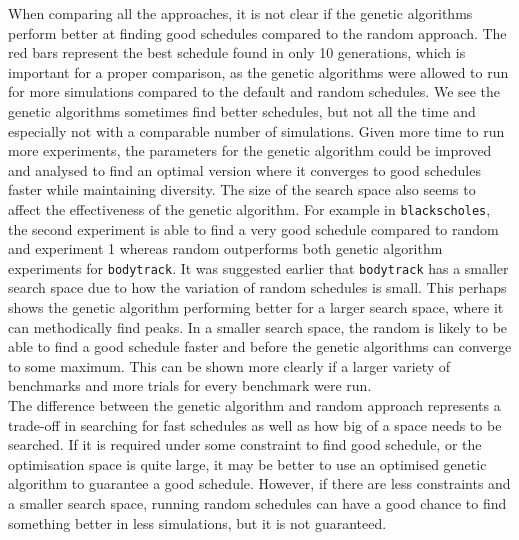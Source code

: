 \documentclass{article}
\newcommand{\n}[0]{\\[\baselineskip]}
\begin{document}
When comparing all the approaches, it is not clear if the genetic algorithms perform better at finding good schedules compared to the random approach. The red bars represent the best schedule found in only 10 generations, which is important for a proper comparison, as the genetic algorithms were allowed to run for more simulations compared to the default and random schedules. We see the genetic algorithms sometimes find better schedules, but not all the time and especially not with a comparable number of simulations. Given more time to run more experiments, the parameters for the genetic algorithm could be improved and analysed to find an optimal version where it converges to good schedules faster while maintaining diversity. The size of the search space also seems to affect the effectiveness of the genetic algorithm. For example in \texttt{blackscholes}, the second experiment is able to find a very good schedule compared to random and experiment 1 whereas random outperforms both genetic algorithm experiments for \texttt{bodytrack}. It was suggested earlier that \texttt{bodytrack} has a smaller search space due to how the variation of random schedules is small. This perhaps shows the genetic algorithm performing better for a larger search space, where it can methodically find peaks. In a smaller search space, the random is likely to be able to find a good schedule faster and before the genetic algorithms can converge to some maximum. This can be shown more clearly if a larger variety of benchmarks and more trials for every benchmark were run. 
\n
The difference between the genetic algorithm and random approach represents a trade-off in searching for fast schedules as well as how big of a space needs to be searched. If it is required under some constraint to find good schedule, or the optimisation space is quite large, it may be better to use an optimised genetic algorithm to guarantee a good schedule. However, if there are less constraints and a smaller search space, running random schedules can have a good chance to find something better in less simulations, but it is not guaranteed.
\end{document}
